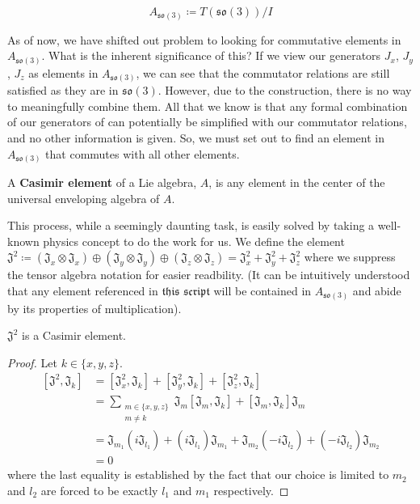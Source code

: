 $$A_{\mathfrak{so}(3)} \coloneq T(\mathfrak{so}(3)) / I$$

As of now, we have shifted out problem to looking for commutative elements in $A_{\mathfrak{so}(3)}$. What is the inherent significance of this? If we view our generators $J_x$, $J_y$, $J_z$ as elements in $A_{\mathfrak{so}(3)}$, we can see that the commutator relations are still satisfied as they are in $\mathfrak{so}(3)$. However, due to the construction, there is no way to meaningfully combine them. All that we know is that any formal combination of our generators of can potentially be simplified with our commutator relations, and no other information is given. So, we must set out to find an element in $A_{\mathfrak{so}(3)}$ that commutes with all other elements.

\begin{definition}
	A \textbf{Casimir element} of a Lie algebra, $A$, is any element in the center of the universal enveloping algebra of $A$.
\end{definition}

This process, while a seemingly daunting task, is easily solved by taking a well-known physics concept to do the work for us. We define the element $\mathfrak{J^2} \coloneq (\mathfrak{J}_x \otimes \mathfrak{J}_x) \oplus (\mathfrak{J}_y \otimes \mathfrak{J}_y) \oplus (\mathfrak{J}_z \otimes \mathfrak{J}_z) = \mathfrak{J}_x^2 + \mathfrak{J}_y^2 + \mathfrak{J}_z^2$ where we suppress the tensor algebra notation for easier readbility. (It can be intuitively understood that any element referenced in $\mathfrak{this}$ $\mathfrak{script}$ will be contained in $A_{\mathfrak{so}(3)}$ and abide by its properties of multiplication).

\begin{theorem}
	$\mathfrak{J^2}$ is a Casimir element.
\end{theorem}

\noindent \begin{proof} Let $k\in \{x,y,z\}$.
\begin{equation}
\begin{aligned}
	[\mathfrak{J^2}, \mathfrak{J}_k] &= [\mathfrak{J}_x^2, \mathfrak{J}_k] + [\mathfrak{J}_y^2, \mathfrak{J}_k] + [\mathfrak{J}_z^2, \mathfrak{J}_k]\\
										 &=\sum_{\substack{m\in\{x,y,z\} \\ m\neq k}} \mathfrak{J}_m [\mathfrak{J}_m, \mathfrak{J}_k] + [\mathfrak{J}_m, \mathfrak{J}_k]\mathfrak{J}_m\\
										&= \mathfrak{J}_{m_1}(i\mathfrak{J}_{l_1})+ (i\mathfrak{J}_{l_1}) \mathfrak{J}_{m_1} + \mathfrak{J}_{m_2}(-i\mathfrak{J}_{l_2}) +(-i\mathfrak{J}_{l_2}) \mathfrak{J}_{m_2} \\
										&= 0
\end{aligned}
\end{equation}
where the last equality is established by the fact that our choice is limited to $m_2$ and $l_2$ are forced to be exactly $l_1$ and $m_1$ respectively. \end{proof}

